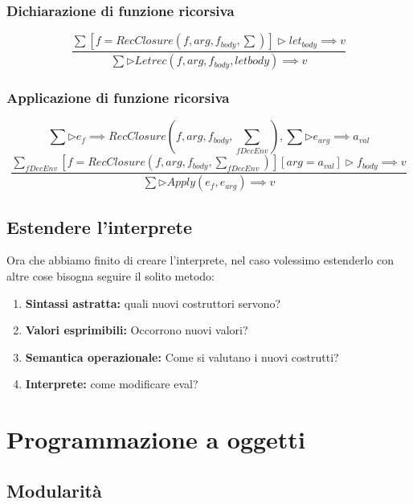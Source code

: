 \documentclass[12pt,a4paper]{article}
\let\oldsection\section
\renewcommand{\section}{\clearpage\oldsection}
\begin{document}
\subsubsection{Dichiarazione di funzione ricorsiva}
\[
\frac{\sum[f = RecClosure(f, arg, f_{body}, \sum)] \triangleright let_{body} \implies v}{\sum \triangleright Letrec(f, arg, f_{body}, let{body}) \implies v}
\]
\subsubsection{Applicazione di funzione ricorsiva}
\[
\sum \triangleright e_f \implies RecClosure(f, arg, f_{body}, \sum_{fDecEnv}), \sum \triangleright e_{arg} \implies a_{val}
\]
\[
\frac{\sum_{fDecEnv}[f = RecClosure(f, arg, f_{body}, \sum_{fDecEnv})][arg = a_{val}] \triangleright f_{body} \implies v}{\sum \triangleright Apply(e_f, e_{arg}) \implies v}
\]
\subsection{Estendere l'interprete}
Ora che abbiamo finito di creare l'interprete, nel caso volessimo estenderlo con altre cose bisogna seguire il solito metodo:
\begin{enumerate}
  \item \textbf{Sintassi astratta:} quali nuovi costruttori servono?
  \item \textbf{Valori esprimibili:} Occorrono nuovi valori?
  \item \textbf{Semantica operazionale:} Come si valutano i nuovi costrutti?
  \item \textbf{Interprete:} come modificare eval?
\end{enumerate}

\section{Programmazione a oggetti}
\subsection{Modularità}
\end{document}
